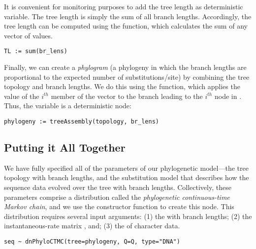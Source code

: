 It is convenient for monitoring purposes to add the tree length as deterministic variable. The tree length is simply the sum of all branch lengths.
Accordingly, the tree length can be computed using the  function, which calculates the sum of any vector of values.
{\tt \begin{snugshade*}
\begin{lstlisting}
TL := sum(br_lens)
\end{lstlisting}
\end{snugshade*}}

Finally, we can create a \emph{phylogram} (a phylogeny in which the branch lengths are proportional to the expected number of substitutions/site) by combining the tree topology and branch lengths.
We do this using the  function, which applies the value of the $i^{th}$ member of the  vector to the branch leading to the $i^{th}$ node in . 
Thus, the  variable is a deterministic node: 

{\tt \begin{snugshade*}
\begin{lstlisting}
phylogeny := treeAssembly(topology, br_lens)
\end{lstlisting}
\end{snugshade*}}



\subsection{Putting it All Together}

We have fully specified all of the parameters of our phylogenetic model---the tree topology with branch lengths, and the substitution model that describes how the sequence data evolved over the tree with branch lengths.  
Collectively, these parameters comprise a distribution called the \textit{phylogenetic continuous-time Markov chain}, and we use the  constructor function to create this node.
This distribution requires several input arguments: 
(1) the  with branch lengths; 
(2) the instantaneous-rate matrix , and; 
(3) the  of character data.
{\tt \begin{snugshade*}
\begin{lstlisting}
seq ~ dnPhyloCTMC(tree=phylogeny, Q=Q, type="DNA")
\end{lstlisting}
\end{snugshade*}}


